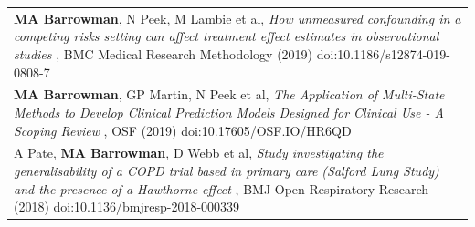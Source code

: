 \documentclass[
]{article}
\begin{document}
\begin{table}[H]
\centering
\begin{tabular}{>{\raggedright\arraybackslash}p{}}
\toprule
\textbf{MA Barrowman}, N Peek, M Lambie et al, \emph{ How unmeasured confounding in a competing risks setting can affect treatment effect estimates in observational studies }, BMC Medical Research Methodology (2019) doi:10.1186/s12874-019-0808-7\\
\textbf{MA Barrowman}, GP Martin, N Peek et al, \emph{ The Application of Multi-State Methods to Develop Clinical Prediction Models Designed for Clinical Use - A Scoping Review }, OSF (2019) doi:10.17605/OSF.IO/HR6QD\\
A Pate, \textbf{MA Barrowman}, D Webb et al, \emph{ Study investigating the generalisability of a COPD trial based in primary care (Salford Lung Study) and the presence of a Hawthorne effect }, BMJ Open Respiratory Research (2018) doi:10.1136/bmjresp-2018-000339\\
\bottomrule
\end{tabular}
\end{table}
\end{document}
